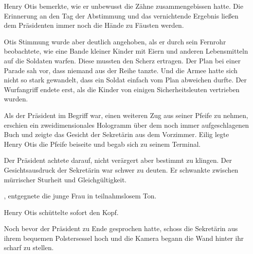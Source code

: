 \par

Henry Otis bemerkte, wie er unbewusst die Zähne zusammengebissen hatte. Die Erinnerung an den Tag der Abstimmung und das vernichtende Ergebnis ließen dem Präsidenten immer noch die Hände zu Fäusten werden.

\par

Otis Stimmung wurde aber deutlich angehoben, als er durch sein Fernrohr beobachtete, wie eine Bande kleiner Kinder mit Eiern und anderen Lebensmitteln auf die Soldaten warfen. Diese mussten den Scherz ertragen. Der Plan bei einer Parade sah vor, dass niemand aus der Reihe tanzte. Und die Armee hatte sich nicht so stark gewandelt, dass ein Soldat einfach vom Plan abweichen durfte. Der Wurfangriff endete erst, als die Kinder von einigen Sicherheitsleuten vertrieben wurden.

\par

Als der Präsident im Begriff war, einen weiteren Zug aus seiner Pfeife zu nehmen, erschien ein zweidimensionales Hologramm über dem noch immer aufgeschlagenen Buch und zeigte das Gesicht der Sekretärin aus dem Vorzimmer. Eilig legte Henry Otis die Pfeife beiseite und begab sich zu seinem Terminal.

\par

 Der Präsident achtete darauf, nicht verärgert aber bestimmt zu klingen. Der Gesichtsausdruck der Sekretärin war schwer zu deuten. Er schwankte zwischen mürrischer Sturheit und Gleichgültigkeit.

\par

, entgegnete die junge Frau in teilnahmslosem Ton.

\par

Henry Otis schüttelte sofort den Kopf. 

\par

Noch bevor der Präsident zu Ende gesprochen hatte, schoss die Sekretärin aus ihrem bequemen Polstersessel hoch und die Kamera begann die Wand hinter ihr scharf zu stellen.

\par

